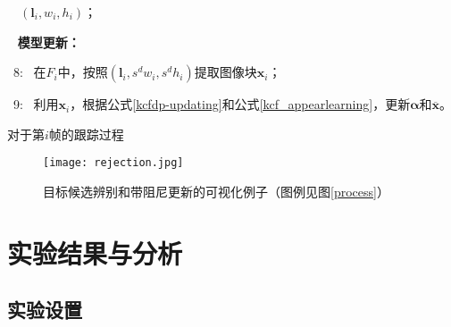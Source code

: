 \begin{algorithm}[htb]
\begin{flushleft}
		{\quad{}\ \ }{$(\mathbf{l}_{i}, w_{i}, h_{i})$；}{\small \par}
		\vspace{0.1in}
		{\quad{}\ }{{} \textbf{模型更新：}}{\small \par}
		{{} \ 8: \ 在$F_i$中，按照$(\mathbf{l}_{i}, s^dw_{i}, s^dh_{i})$提取图像块$\mathbf{x}_i$；}{\small \par}
		{{} \ 9: \ 利用$\mathbf{x}_i$，根据公式\ref{kcfdp-updating}和公式\ref{kcf_appearlearning}，更新$\boldsymbol{\alpha}$和$\overline{\mathbf{x}}$。}
	\end{flushleft}
	\caption{对于第$i$帧的跟踪过程}
	\label{algorithm}
\end{algorithm}

\begin{figure}[htb]
	\centering
		\texttt{[image: rejection.jpg]}
	\caption{目标候选辨别和带阻尼更新的可视化例子（图例见图\ref{process}）}
	\label{rejection}
\end{figure}


\section{实验结果与分析}
\subsection{实验设置}

